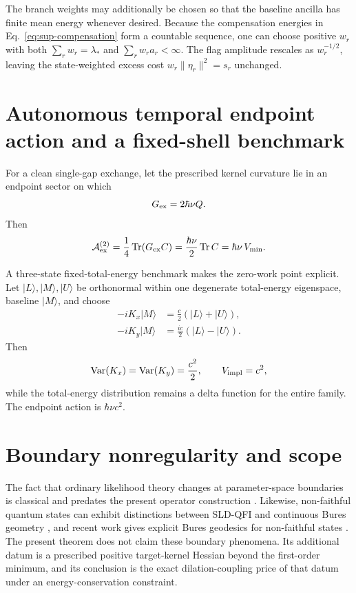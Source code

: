 \documentclass[aps,pra,preprint,nofootinbib]{revtex4-2}
\newcommand{\Tr}{\operatorname{Tr}}
\newcommand{\Var}{\operatorname{Var}}
\newcommand{\Cker}{C}
\begin{document}
The branch weights may additionally be chosen so that the baseline ancilla has finite mean energy whenever desired. Because the compensation energies in Eq.~\eqref{eq:sup-compensation} form a countable sequence, one can choose positive $w_r$ with both $\sum_rw_r=\lambda_*$ and $\sum_rw_ra_r<\infty$. The flag amplitude rescales as $w_r^{-1/2}$, leaving the state-weighted excess cost $w_r\|\eta_r\|^2=s_r$ unchanged.

\section{Autonomous temporal endpoint action and a fixed-shell benchmark}

For a clean single-gap exchange, let the prescribed kernel curvature lie in an endpoint sector on which
\begin{equation}
 G_{\rm ex}=2\hbar\nu Q.
\end{equation}
Then
\begin{equation}
 \mathcal A_{\rm ex}^{(2)}
 =\frac14\Tr(G_{\rm ex}\Cker)
 =\frac{\hbar\nu}{2}\Tr\Cker
 =\hbar\nu\,V_{\min}.
\end{equation}

A three-state fixed-total-energy benchmark makes the zero-work point explicit. Let $|L\rangle,|M\rangle,|U\rangle$ be orthonormal within one degenerate total-energy eigenspace, baseline $|M\rangle$, and choose
\begin{align}
 -iK_x|M\rangle&=\frac c2(|L\rangle+|U\rangle),\\
 -iK_y|M\rangle&=\frac{ic}{2}(|L\rangle-|U\rangle).
\end{align}
Then
\begin{equation}
 \Var(K_x)=\Var(K_y)=\frac{c^2}{2},
 \qquad V_{\rm impl}=c^2,
\end{equation}
while the total-energy distribution remains a delta function for the entire family. The endpoint action is $\hbar\nu c^2$.

\section{Boundary nonregularity and scope}

The fact that ordinary likelihood theory changes at parameter-space boundaries is classical and predates the present operator construction \cite{Chernoff1954,Shapiro1985,SelfLiang1987}. Likewise, non-faithful quantum states can exhibit distinctions between SLD-QFI and continuous Bures geometry \cite{Safranek2017}, and recent work gives explicit Bures geodesics for non-faithful states \cite{CarrascoSpehner2026}. The present theorem does not claim these boundary phenomena. Its additional datum is a prescribed positive target-kernel Hessian beyond the first-order minimum, and its conclusion is the exact dilation-coupling price of that datum under an energy-conservation constraint.
\end{document}
